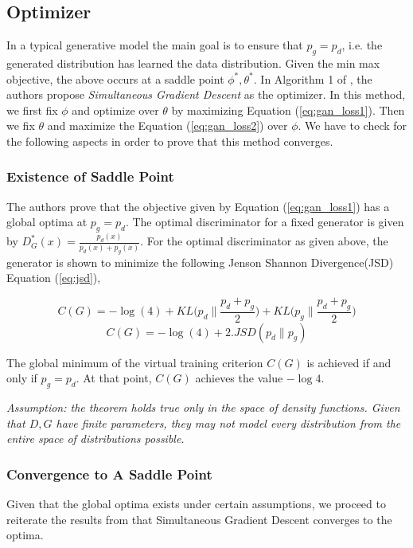 \subsection{Optimizer}
In a typical generative model the main goal is to ensure that $p_g = p_d$, i.e. the generated distribution has learned the data distribution. Given the min max objective, the above occurs at a saddle point $\phi^* , \theta^*$. In Algorithm 1 of \citep{ganGoodfellow}, the authors propose \emph{Simultaneous Gradient Descent} as the optimizer. In this method, we first fix $\phi$ and optimize over $\theta$ by maximizing Equation (\ref{eq:gan_loss1}). Then we fix $\theta$ and maximize the Equation (\ref{eq:gan_loss2}) over $\phi$. We have to check for the following aspects in order to prove that this method converges. 
\subsubsection{Existence of Saddle Point}
The authors prove that the objective given by Equation (\ref{eq:gan_loss1}) has a global optima at $p_g = p_d$.
 The optimal discriminator for a fixed generator is given by $D^*_{G}(x) = \frac{p_{d}(x)}{p_{d}(x) + p_{g}(x)}$. For the optimal discriminator as given above, the generator is shown to minimize the following Jenson Shannon Divergence(JSD) Equation (\ref{eq:jsd}), 
 
    \begin{equation}\label{eq:2}
         C(G) = -\log(4) + KL\bigg(p_{d} \parallel \frac{p_{d} + p_{g}}{2} \bigg) + KL\bigg(p_{g} \parallel \frac{p_{d} + p_{g}}{2} \bigg)
    \end{equation}
    \begin{equation}\label{eq:3}
    C(G) = -\log(4) + 2. JSD(p_{d} \parallel p_{g})
    \end{equation} 
    
\begin{tcolorbox}[colback=gray!03!white,colframe=black!75!black]
\begin{theorem} \citep{ganGoodfellow}
The global minimum of the virtual training criterion $C(G)$ is achieved if and only if $p_g=p_d$. At that point, $C(G)$ achieves the value $−\log 4$.
\end{theorem}{} 
\emph{Assumption: the theorem holds true only in the space of density functions. Given that $D, G$ have finite parameters, they may not model every distribution from the entire space of distributions possible.  }
\end{tcolorbox}
\subsubsection{Convergence to A Saddle Point}
Given that the global optima exists under certain assumptions, we proceed to reiterate the results from \citep{ganGoodfellow} that Simultaneous Gradient Descent converges to the optima. 

